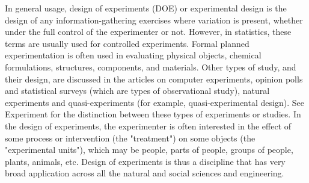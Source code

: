 In general usage, design of experiments (DOE) or experimental design is the design of any information-gathering exercises where variation is present, whether under the full control of the experimenter or not. However, in statistics, these terms are usually used for controlled experiments. Formal planned experimentation is often used in evaluating physical objects, chemical formulations, structures, components, and materials. Other types of study, and their design, are discussed in the articles on computer experiments, opinion polls and statistical surveys (which are types of observational study), natural experiments and quasi-experiments (for example, quasi-experimental design). See Experiment for the distinction between these types of experiments or studies.
In the design of experiments, the experimenter is often interested in the effect of some process or intervention (the "treatment") on some objects (the "experimental units"), which may be people, parts of people, groups of people, plants, animals, etc. Design of experiments is thus a discipline that has very broad application across all the natural and social sciences and engineering.
